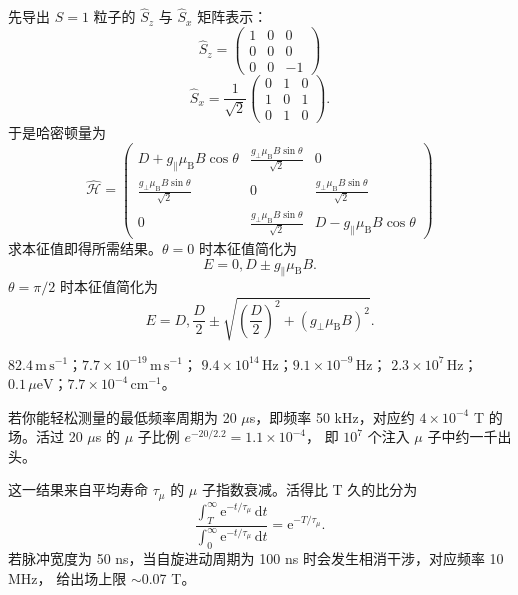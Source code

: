  先导出 $S=1$ 粒子的 $\hat{S}_z$ 与 $\hat{S}_x$ 矩阵表示：
\begin{equation*}
\hat{S}_z = \begin{pmatrix}1 & 0 & 0\\ 0 & 0 & 0\\ 0 & 0 & -1\end{pmatrix}\tag{F.25}
\end{equation*}
\begin{equation*}
\hat{S}_x = \frac{1}{\sqrt{2}}\begin{pmatrix}0 & 1 & 0\\ 1 & 0 & 1\\ 0 & 1 & 0\end{pmatrix}.\tag{F.26}
\end{equation*}
于是哈密顿量为
\begin{equation*}
\hat{\mathcal{H}} = \begin{pmatrix} D+g_{\parallel}\mu_{\mathrm{B}}B\cos\theta & \frac{g_{\perp}\mu_{\mathrm{B}}B\sin\theta}{\sqrt{2}} & 0\\ \frac{g_{\perp}\mu_{\mathrm{B}}B\sin\theta}{\sqrt{2}} & 0 & \frac{g_{\perp}\mu_{\mathrm{B}}B\sin\theta}{\sqrt{2}}\\ 0 & \frac{g_{\perp}\mu_{\mathrm{B}}B\sin\theta}{\sqrt{2}} & D-g_{\parallel}\mu_{\mathrm{B}}B\cos\theta \end{pmatrix}\tag{F.27}
\end{equation*}
求本征值即得所需结果。$\theta=0$ 时本征值简化为
\begin{equation*}
E = 0, D\pm g_{\parallel}\mu_{\mathrm{B}}B.\tag{F.28}
\end{equation*}
$\theta=\pi/2$ 时本征值简化为
\begin{equation*}
E = D, \frac{D}{2}\pm\sqrt{\left(\frac{D}{2}\right)^{2}+(g_{\perp}\mu_{\mathrm{B}}B)^{2}}.\tag{F.29}
\end{equation*}

 $82.4\,\mathrm{m\,s^{-1}}$；$7.7\times10^{-19}\,\mathrm{m\,s^{-1}}$；
$9.4\times10^{14}\,\mathrm{Hz}$；$9.1\times10^{-9}\,\mathrm{Hz}$；
$2.3\times10^{7}\,\mathrm{Hz}$；$0.1\,\mu\mathrm{eV}$；$7.7\times10^{-4}\,\mathrm{cm^{-1}}$。

 若你能轻松测量的最低频率周期为 20 $\mu$s，即频率 50 kHz，对应约
$4\times10^{-4}$ T 的场。活过 20 $\mu$s 的 $\mu$ 子比例 $e^{-20/2.2}=1.1\times10^{-4}$，
即 $10^{7}$ 个注入 $\mu$ 子中约一千出头。

这一结果来自平均寿命 $\tau_{\mu}$ 的 $\mu$ 子指数衰减。活得比 T 久的比分为
\begin{equation*}
\frac{\int_T^{\infty}\mathrm{e}^{-t/\tau_{\mu}}\,\mathrm{d}t}{\int_0^{\infty}\mathrm{e}^{-t/\tau_{\mu}}\,\mathrm{d}t} = \mathrm{e}^{-T/\tau_{\mu}}.\tag{F.30}
\end{equation*}
若脉冲宽度为 50 ns，当自旋进动周期为 100 ns 时会发生相消干涉，对应频率 10 MHz，
给出场上限 $\sim$0.07 T。

